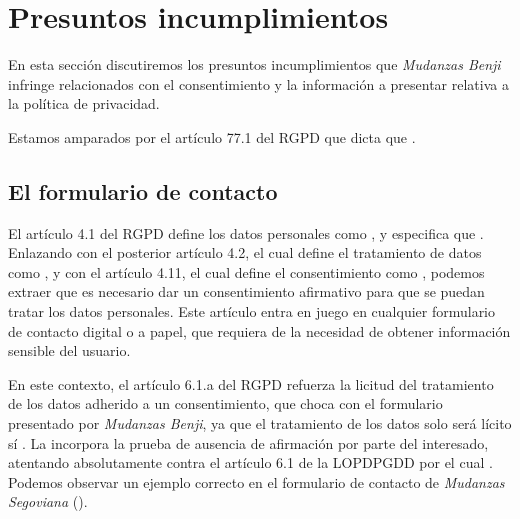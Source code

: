 \section{Presuntos incumplimientos}
En esta sección discutiremos los presuntos incumplimientos que \textit{Mudanzas Benji} infringe relacionados con el consentimiento y la información a presentar relativa a la política de privacidad.

Estamos amparados por el artículo 77.1 del RGPD que dicta que .



\subsection{El formulario de contacto}\label{subsec:contacto}
El artículo 4.1 del RGPD define los datos personales como , y especifica que . Enlazando con el posterior artículo 4.2, el cual define el tratamiento de datos como , y con el artículo 4.11, el cual define el consentimiento como , podemos extraer que es necesario dar un consentimiento afirmativo para que se puedan tratar los datos personales. Este artículo entra en juego en cualquier formulario de contacto digital o a papel, que requiera de la necesidad de obtener información sensible del usuario.

En este contexto, el artículo 6.1.a del RGPD refuerza la licitud del tratamiento de los datos adherido a un consentimiento, que choca con el formulario presentado por \textit{Mudanzas Benji}, ya que el tratamiento de los datos solo será lícito sí . La  incorpora la prueba de ausencia de afirmación por parte del interesado, atentando absolutamente contra el artículo 6.1 de la LOPDPGDD por el cual . Podemos observar un ejemplo correcto en el formulario de contacto de \textit{Mudanzas Segoviana} ().

